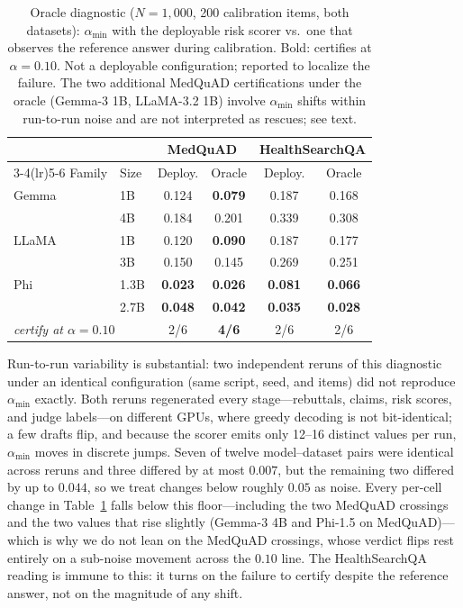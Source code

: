 \documentclass[sigconf, review, anonymous]{acmart}
\begin{document}
\begin{table}[t]
\centering
\caption{Oracle diagnostic ($N=1{,}000$, 200 calibration items, both
datasets): $\alpha_{\min}$ with the deployable risk scorer vs.\ one that
observes the reference answer during calibration. Bold: certifies at
$\alpha=0.10$. Not a deployable configuration; reported to localize the
failure. The two additional MedQuAD certifications under the oracle (Gemma-3
1B, LLaMA-3.2 1B) involve $\alpha_{\min}$ shifts within run-to-run noise and
are not interpreted as rescues; see text.}
\label{tab:oracle}
\small
\begin{tabular}{llcccc}
\toprule
& & \multicolumn{2}{c}{MedQuAD} & \multicolumn{2}{c}{HealthSearchQA} \\
\cmidrule(lr){3-4}\cmidrule(lr){5-6}
Family & Size & Deploy. & Oracle & Deploy. & Oracle \\
\midrule
Gemma & 1B   & 0.124 & \textbf{0.079} & 0.187 & 0.168 \\
      & 4B   & 0.184 & 0.201 & 0.339 & 0.308 \\
LLaMA & 1B   & 0.120 & \textbf{0.090} & 0.187 & 0.177 \\
      & 3B   & 0.150 & 0.145 & 0.269 & 0.251 \\
Phi   & 1.3B & \textbf{0.023} & \textbf{0.026} & \textbf{0.081} & \textbf{0.066} \\
      & 2.7B & \textbf{0.048} & \textbf{0.042} & \textbf{0.035} & \textbf{0.028} \\
\midrule
\multicolumn{2}{l}{\emph{certify at $\alpha=0.10$}} & 2/6 & \textbf{4/6} & 2/6 & 2/6 \\
\bottomrule
\end{tabular}
\end{table}

Run-to-run variability is substantial: two independent reruns of this
diagnostic under an identical configuration (same script, seed, and items)
did not reproduce $\alpha_{\min}$ exactly. Both reruns
regenerated every stage---rebuttals, claims, risk scores, and judge
labels---on different GPUs, where greedy decoding is not bit-identical; a
few drafts flip, and because the scorer emits only 12--16 distinct
values per run, $\alpha_{\min}$ moves in discrete jumps. Seven of twelve
model--dataset pairs were identical across reruns and three differed by at
most $0.007$, but the remaining two differed by up to $0.044$, so we treat changes below roughly $0.05$ as
noise. Every per-cell change in Table~\ref{tab:oracle} falls below this
floor---including the two MedQuAD crossings and the two values that rise
slightly (Gemma-3 4B and Phi-1.5 on MedQuAD)---which is why we do not lean on
the MedQuAD crossings, whose verdict flips rest entirely on a sub-noise
movement across the $0.10$ line. The HealthSearchQA reading is immune to this:
it turns on the failure to certify despite the reference answer, not on the
magnitude of any shift.
\end{document}
